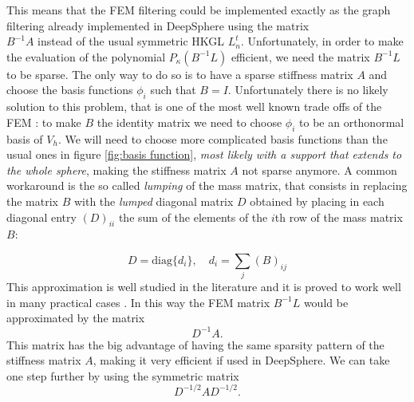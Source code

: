 This means that the FEM filtering could be implemented exactly as the graph filtering already implemented in DeepSphere using the matrix \\$B^{-1}A$ instead of the usual symmetric HKGL $L_n^t$. Unfortunately, in order to make the evaluation of the polynomial $P_\kappa(B^{-1}L)$ efficient, we need the matrix $B^{-1}L$ to be sparse. The only way to do so is to have a sparse stiffness matrix $A$ and choose the basis functions $\phi_i$ such that $B=I$. Unfortunately there is no likely solution to this problem, that is one of the most well known trade offs of the FEM \cite{Strang}: to make $B$ the identity matrix we need to choose $\phi_i$ to be an orthonormal basis of $V_h$. We will need to choose more complicated basis functions than the usual ones in figure \ref{fig:basis function}, \textit{most likely with a support that extends to the whole sphere}, making the stiffness matrix $A$ not sparse anymore. A common workaround \cite{Strang} is the so called \textit{lumping} of the mass matrix, that consists in replacing the matrix $B$ with the \textit{lumped} diagonal matrix $D$ obtained by placing in each diagonal entry $(D)_{ii}$ the sum of the elements of the $i$th row of the mass matrix $B$:

\begin{equation}\label{eq:lumping}
D = \text{diag}\{d_i\},\quad d_i = \sum_j (B)_{ij}
\end{equation}
This approximation is well studied in the literature and it is proved to work well in many practical cases \cite{Quarteroni:1639539}. In this way the FEM matrix $B^{-1}L$ would be approximated by the matrix
$$
D^{-1}A.
$$
This matrix has the big advantage of having the same sparsity pattern of the stiffness matrix $A$, making it very efficient if used in DeepSphere. We can take one step further by using the symmetric matrix
$$
D^{-1/2}AD^{-1/2}.
$$


